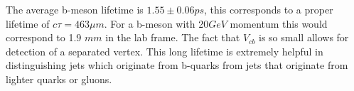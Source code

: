 The average b-meson lifetime is $1.55\pm 0.06 ps$, this corresponds to a proper lifetime of
$c\tau=463\mu m$. For a b-meson with 20$GeV$ momentum this would correspond to
1.9 $mm$ in the lab frame. The fact that $V_{cb}$ is so small allows for detection of a separated vertex. 
This long lifetime is extremely helpful in distinguishing jets which
originate from b-quarks from jets that originate from lighter quarks or gluons. 

